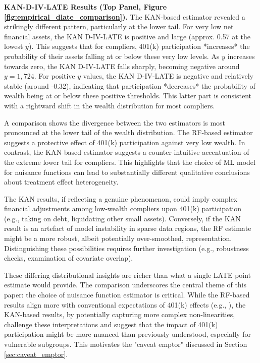 \documentclass[final,3p,fleqn, 10pt]{elsarticle}
\begin{document}
\textbf{KAN-D-IV-LATE Results (Top Panel, Figure \ref{fig:empirical_dlate_comparison}).}
The KAN-based estimator revealed a strikingly different pattern, particularly at the lower tail. For very low net financial assets, the KAN D-IV-LATE is positive and large (approx. 0.57 at the lowest $y$). This suggests that for compliers, 401(k) participation *increases* the probability of their assets falling at or below these very low levels. As $y$ increases towards zero, the KAN D-IV-LATE falls sharply, becoming negative around $y = 1,724$. For positive $y$ values, the KAN D-IV-LATE is negative and relatively stable (around -0.32), indicating that participation *decreases* the probability of wealth being at or below these positive thresholds. This latter part is consistent with a rightward shift in the wealth distribution for most compliers.

A comparison shows the divergence between the two estimators is most pronounced at the lower tail of the wealth distribution. The RF-based estimator suggests a protective effect of 401(k) participation against very low wealth. In contrast, the KAN-based estimator suggests a counter-intuitive accentuation of the extreme lower tail for compliers. This highlights that the choice of ML model for nuisance functions can lead to substantially different qualitative conclusions about treatment effect heterogeneity.

The KAN results, if reflecting a genuine phenomenon, could imply complex financial adjustments among low-wealth compliers upon 401(k) participation (e.g., taking on debt, liquidating other small assets). Conversely, if the KAN result is an artefact of model instability in sparse data regions, the RF estimate might be a more robust, albeit potentially over-smoothed, representation. Distinguishing these possibilities requires further investigation (e.g., robustness checks, examination of covariate overlap).

These differing distributional insights are richer than what a single LATE point estimate would provide. The comparison underscores the central theme of this paper: the choice of nuisance function estimator is critical. While the RF-based results align more with conventional expectations of 401(k) effects (e.g., \citet{chernozhukov2004impact}), the KAN-based results, by potentially capturing more complex non-linearities, challenge these interpretations and suggest that the impact of 401(k) participation might be more nuanced than previously understood, especially for vulnerable subgroups. This motivates the "caveat emptor" discussed in Section \ref{sec:caveat_emptor}.
\end{document}
